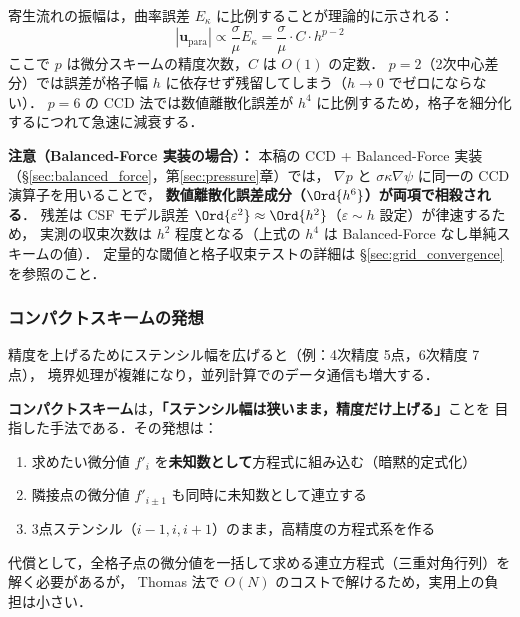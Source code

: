 \begin{tcolorbox}[defbox, title={精度次数と寄生流れの関係}]
寄生流れの振幅は，曲率誤差 $E_\kappa$ に比例することが理論的に示される：
\[
  |\bm{u}_{\text{para}}| \propto \frac{\sigma}{\mu} E_\kappa = \frac{\sigma}{\mu} \cdot C \cdot h^{p-2}
\]
ここで $p$ は微分スキームの精度次数，$C$ は $O(1)$ の定数．
$p=2$（2次中心差分）では誤差が格子幅 $h$ に依存せず残留してしまう（$h \to 0$ でゼロにならない）．
$p=6$ の CCD 法では数値離散化誤差が $h^4$ に比例するため，格子を細分化するにつれて急速に減衰する．

\textbf{注意（Balanced-Force 実装の場合）：}
本稿の CCD + Balanced-Force 実装（§\ref{sec:balanced_force}，第\ref{sec:pressure}章）では，
$\nabla p$ と $\sigma\kappa\nabla\psi$ に同一の CCD 演算子を用いることで，
\textbf{数値離散化誤差成分（$\Ord{h^6}$）が両項で相殺される}．
残差は CSF モデル誤差 $\Ord{\varepsilon^2}\approx\Ord{h^2}$（$\varepsilon\sim h$ 設定）が律速するため，
実測の収束次数は $h^2$ 程度となる（上式の $h^4$ は Balanced-Force なし単純スキームの値）．
定量的な閾値と格子収束テストの詳細は §\ref{sec:grid_convergence} を参照のこと．
\end{tcolorbox}

\subsubsection{コンパクトスキームの発想}

精度を上げるためにステンシル幅を広げると（例：4次精度 5点，6次精度 7点），
境界処理が複雑になり，並列計算でのデータ通信も増大する．

\textbf{コンパクトスキーム}は，\textbf{「ステンシル幅は狭いまま，精度だけ上げる」}ことを
目指した手法である．その発想は：
\begin{enumerate}
  \item 求めたい微分値 $f'_i$ を\textbf{未知数として}方程式に組み込む（暗黙的定式化）
  \item 隣接点の微分値 $f'_{i\pm1}$ も同時に未知数として連立する
  \item 3点ステンシル（$i-1, i, i+1$）のまま，高精度の方程式系を作る
\end{enumerate}
代償として，全格子点の微分値を一括して求める連立方程式（三重対角行列）を解く必要があるが，
Thomas 法で $O(N)$ のコストで解けるため，実用上の負担は小さい．

